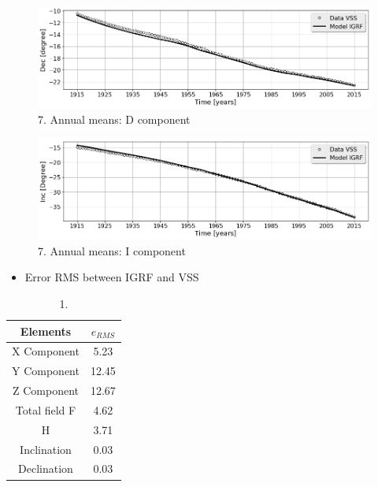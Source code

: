 \documentclass[final,t]{beamer}
\begin{document}
\begin{columns}[t]
\begin{column}{.47\linewidth}
\begin{columns}
\begin{column}{.48\linewidth}
\begin{block}
\begin{figure}
\centering
\includegraphics[scale=0.6]{"figs_ed/D mean all_v3"}
\caption{7. Annual means: D component}
\label{fig:Dmeanall_v3}
\end{figure}

\begin{figure}
\centering
\includegraphics[scale=0.6]{"figs_ed/I mean all_v3"}
\caption{7. Annual means: I component}
\label{fig:Imeanall_v3}
\end{figure}

\begin{itemize}
	\item	 Error RMS between IGRF and VSS
\end{itemize}
	\begin{table}
		\begin{tabular}{|c|c|}
			\hline
				
			\hline Elements  & $e_{RMS}$\\ 
			\hline X Component      & 5.23  \\ 
			\hline Y Component     & 12.45\\ 
			\hline Z Component     & 12.67\\ 
			\hline Total field F     & 4.62\\ 
			\hline H      & 3.71\\ 
			\hline Inclination  & 0.03\\ 
			\hline Declination  & 0.03\\ 
			\hline 
		\end{tabular} 
		\caption{1. }
	\end{table}
	

\end{block}
\end{column}
\end{columns}
\end{column}
\end{columns}
\end{document}
